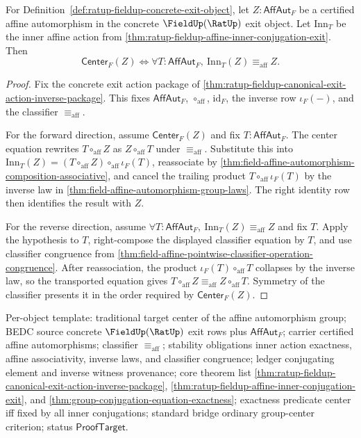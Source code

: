 \begin{theorem}
\label{thm:ratup-fieldup-affine-center-fixed-point-criterion}
For Definition~\ref{def:ratup-fieldup-concrete-exit-object}, let
$Z:\mathsf{AffAut}_F$ be a certified affine automorphism in the concrete
$\FieldUp(\RatUp)$ exit object. Let $\mathrm{Inn}_T$ be the inner affine action
from \autoref{thm:ratup-fieldup-affine-inner-conjugation-exit}. Then
$$
\mathsf{Center}_F(Z)
\Longleftrightarrow
\forall T:\mathsf{AffAut}_F,\ \mathrm{Inn}_T(Z)\equiv_{\mathrm{aff}}Z.
$$
\end{theorem}
\begin{proof}
Fix the concrete exit action package of
\autoref{thm:ratup-fieldup-canonical-exit-action-inverse-package}. This fixes
$\mathsf{AffAut}_F$, $\circ_{\mathrm{aff}}$, $\mathrm{id}_F$, the inverse row
$\iota_F(-)$, and the classifier $\equiv_{\mathrm{aff}}$.

For the forward direction, assume $\mathsf{Center}_F(Z)$ and fix
$T:\mathsf{AffAut}_F$. The center equation rewrites
$T\circ_{\mathrm{aff}}Z$ as $Z\circ_{\mathrm{aff}}T$ under
$\equiv_{\mathrm{aff}}$. Substitute this into
$\mathrm{Inn}_T(Z)=(T\circ_{\mathrm{aff}}Z)\circ_{\mathrm{aff}}\iota_F(T)$,
reassociate by
\autoref{thm:field-affine-automorphism-composition-associative}, and cancel the
trailing product $T\circ_{\mathrm{aff}}\iota_F(T)$ by the inverse law in
\autoref{thm:field-affine-automorphism-group-laws}. The right identity row
then identifies the result with $Z$.

For the reverse direction, assume
$\forall T:\mathsf{AffAut}_F,\ \mathrm{Inn}_T(Z)\equiv_{\mathrm{aff}}Z$ and
fix $T$. Apply the hypothesis to $T$, right-compose the displayed classifier
equation by $T$, and use classifier congruence from
\autoref{thm:field-affine-pointwise-classifier-operation-congruence}. After
reassociation, the product $\iota_F(T)\circ_{\mathrm{aff}}T$ collapses by the
inverse law, so the transported equation gives
$T\circ_{\mathrm{aff}}Z\equiv_{\mathrm{aff}}Z\circ_{\mathrm{aff}}T$. Symmetry
of the classifier presents it in the order required by
$\mathsf{Center}_F(Z)$.
\end{proof}

Per-object template: traditional target center of the affine automorphism
group; BEDC source concrete $\FieldUp(\RatUp)$ exit rows plus
$\mathsf{AffAut}_F$; carrier certified affine automorphisms; classifier
$\equiv_{\mathrm{aff}}$; stability obligations inner action exactness, affine
associativity, inverse laws, and classifier congruence; ledger conjugating
element and inverse witness provenance; core theorem list
\autoref{thm:ratup-fieldup-canonical-exit-action-inverse-package},
\autoref{thm:ratup-fieldup-affine-inner-conjugation-exit}, and
\autoref{thm:group-conjugation-equation-exactness}; exactness predicate center
iff fixed by all inner conjugations; standard bridge ordinary group-center
criterion; status $\mathsf{ProofTarget}$.
